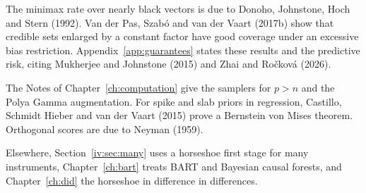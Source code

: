 The minimax rate over nearly black vectors is due to Donoho, Johnstone, Hoch and Stern (1992). Van der Pas, Szab\'o and van der Vaart (2017b) show that credible sets enlarged by a constant factor have good coverage under an excessive bias restriction. Appendix~\ref{app:guarantees} states these results and the predictive risk, citing Mukherjee and Johnstone (2015) and Zhai and Ro\v{c}kov\'a (2026).

The Notes of Chapter~\ref{ch:computation} give the samplers for $p > n$ and the Polya Gamma augmentation. For spike and slab priors in regression, Castillo, Schmidt Hieber and van der Vaart (2015) prove a Bernstein von Mises theorem. Orthogonal scores are due to Neyman (1959).

Elsewhere, Section~\ref{iv:sec:many} uses a horseshoe first stage for many instruments, Chapter~\ref{ch:bart} treats BART and Bayesian causal forests, and Chapter~\ref{ch:did} the horseshoe in difference in differences.

